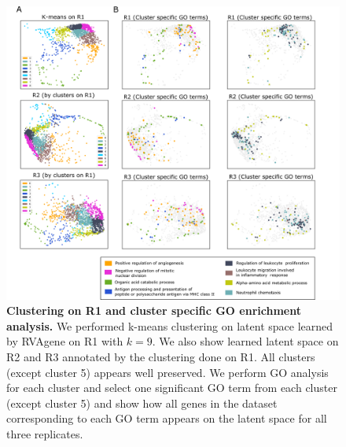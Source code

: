 \begin{center}
\begin{figure}[H]
  \includegraphics[width=\linewidth]{./figures/supp_go.png}
    \caption[Clustering on R1 and cluster specific GO enrichment analysis.]{\textbf{Clustering on R1 and cluster specific GO enrichment analysis.} We performed k-means clustering on latent space learned by RVAgene on R1 with $k=9$. We also show learned latent space on R2 and R3 annotated by the clustering done on R1. All clusters (except cluster 5) appears well preserved. We perform GO analysis for each cluster and select one significant GO term from each cluster (except cluster 5) and show how all genes in the dataset corresponding to each GO term appears on the latent space for all three replicates. }
  \label{fig:figS8}
\end{figure}
\end{center}
\newpage

